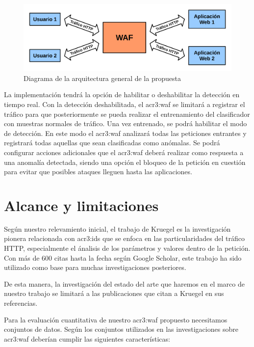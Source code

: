 \begin{figure}[ht]
    \centering
    \includegraphics[width=\linewidth]{images/waf-diagram.png}
    \caption{Diagrama de la arquitectura general de la propuesta}
    \label{fig:arquitectura}
\end{figure}

La implementación tendrá la opción de habilitar o deshabilitar la detección
en tiempo real. Con la detección deshabilitada, el \gls{acr3:waf} se
limitará a registrar el tráfico para que posteriormente se pueda realizar
el entrenamiento del clasificador con muestras normales de tráfico.
Una vez entrenado, se podrá habilitar el modo de detección. En este modo
el \gls{acr3:waf} analizará todas las peticiones entrantes y registrará
todas aquellas que sean clasificadas como anómalas.
Se podrá configurar acciones adicionales que el \gls{acr3:waf} deberá
realizar como respuesta a una anomalía detectada, siendo una opción
el bloqueo de la petición en cuestión para evitar que posibles ataques
lleguen hasta las aplicaciones.


\section{Alcance y limitaciones}

Según nuestro relevamiento inicial, el trabajo de Kruegel
\cite{kruegel2003anomaly} es la investigación pionera relacionada con
\gls{acr3:ids} que se enfoca en las particularidades del tráfico HTTP,
especialmente el ánalisis de los parámetros y valores dentro de la
petición. Con más de 600 citas hasta la fecha según Google Scholar,
este trabajo ha sido utilizado como base para muchas investigaciones
posteriores.

De esta manera, la investigación del estado del arte que haremos en el
marco de nuestro trabajo se limitará a las publicaciones que citan a Kruegel
en sus referencias.
\bigskip

Para la evaluación cuantitativa de nuestro \gls{acr3:waf} propuesto
necesitamos conjuntos de datos. Según \cite{torranoGimenez2015study}
los conjuntos utilizados en las investigaciones sobre \gls{acr3:waf}
deberían cumplir las siguientes características:

